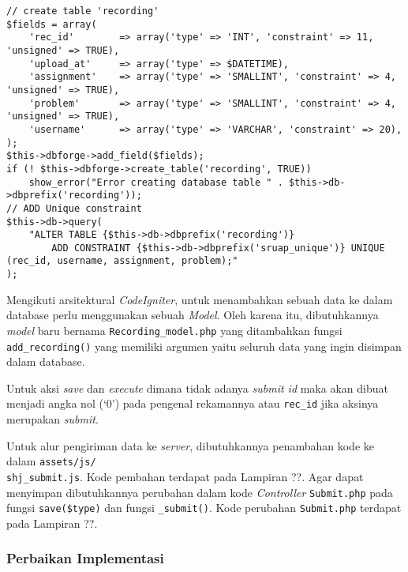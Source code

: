 \begin{enumerate}
    \begin{lstlisting}[caption={Kode membuat database pada SharIF-Judge}, label={kode:5:2:adddatabasetable}]
// create table 'recording'
$fields = array(
    'rec_id' 	    => array('type' => 'INT', 'constraint' => 11, 'unsigned' => TRUE),	
    'upload_at'		=> array('type' => $DATETIME),
    'assignment' 	=> array('type' => 'SMALLINT', 'constraint' => 4, 'unsigned' => TRUE),
    'problem'       => array('type' => 'SMALLINT', 'constraint' => 4, 'unsigned' => TRUE),
    'username'      => array('type' => 'VARCHAR', 'constraint' => 20),
);
$this->dbforge->add_field($fields);
if (! $this->dbforge->create_table('recording', TRUE))
    show_error("Error creating database table " . $this->db->dbprefix('recording'));
// ADD Unique constraint
$this->db->query(
    "ALTER TABLE {$this->db->dbprefix('recording')}
        ADD CONSTRAINT {$this->db->dbprefix('sruap_unique')} UNIQUE (rec_id, username, assignment, problem);"
);
    \end{lstlisting}

    Mengikuti arsitektural \textit{CodeIgniter}, untuk menambahkan sebuah data ke dalam database perlu menggunakan sebuah \textit{Model}. Oleh karena itu, dibutuhkannya \textit{model} baru bernama \verb|Recording_model.php| yang ditambahkan fungsi \verb|add_recording()| yang memiliki argumen yaitu seluruh data yang ingin disimpan dalam database.

    Untuk aksi \textit{save} dan \textit{execute} dimana tidak adanya \textit{submit id} maka akan dibuat menjadi angka nol (`0') pada pengenal rekamannya atau \verb|rec_id| jika aksinya merupakan \textit{submit}.
\end{enumerate}

Untuk alur pengiriman data ke \textit{server}, dibutuhkannya penambahan kode ke dalam \verb|assets/js/|\\\verb|shj_submit.js|. Kode pembahan terdapat pada Lampiran ??. Agar dapat menyimpan dibutuhkannya perubahan dalam kode \textit{Controller} \verb|Submit.php| pada fungsi \verb|save($type)| dan fungsi \verb|_submit()|. Kode perubahan \verb|Submit.php| terdapat pada Lampiran ??.

\subsubsection{Perbaikan Implementasi}

